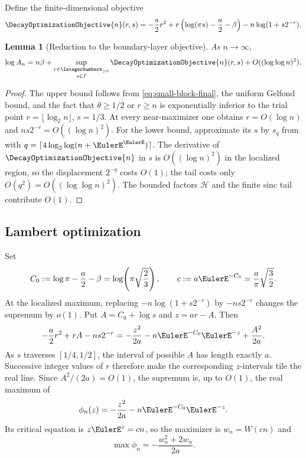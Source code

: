 \documentclass[11pt,oneside]{article}
\newtheorem{lemma}[lemma]{Lemma}
\theoremstyle{definition}
\theoremstyle{remark}
\begin{document}
Define the finite-dimensional objective
\begin{equation}
 \DecayOptimizationObjective{n}(r,s)
 =-\frac a2r^2+r\left(\log(\pi s)-\frac a2-\beta\right)
 -n\log(1+s2^{-r}).
 \label{eq:Fn-final}
\end{equation}

\begin{lemma}[Reduction to the boundary-layer objective]
\label{lem:An-reduction-final}
As $n\to\infty$,
\begin{equation}
 \log A_n=n\beta+
 \sup_{\substack{r\in\IntegerNumbers_{\ge0}\\s\in I}}\DecayOptimizationObjective{n}(r,s)
 +O((\log\log n)^2).
 \label{eq:An-reduction-final}
\end{equation}
\end{lemma}

\begin{proof}
The upper bound follows from \eqref{eq:small-block-final}, the uniform Gelfond bound, and the
fact that $\theta\ge1/2$ or $r\ge n$ is exponentially inferior to the trial point
$r=\lfloor\log_2n\rfloor$, $s=1/3$.  At every near-maximizer one obtains
$r=O(\log n)$ and $ns2^{-r}=O((\log n)^2)$.  For the lower bound, approximate its $s$ by
$s_q$ from  with
$q=\lceil4\log_2\log(n+\EulerE^\EulerE)\rceil$.  The derivative of $\DecayOptimizationObjective{n}$ in $s$ is
$O((\log n)^2)$ in the localized region, so the displacement $2^{-q}$ costs $O(1)$; the
tail costs only $O(q^2)=O((\log\log n)^2)$.  The bounded factors
$\mathcal H$ and the finite sinc tail contribute $O(1)$.
\end{proof}

\subsection{Lambert optimization}

Set
\begin{equation}
 C_0:=\log\pi-\frac a2-\beta=\log\!\left(\pi\sqrt{\frac23}\right),
 \qquad
 c:=a\EulerE^{-C_0}=\frac a\pi\sqrt{\frac32}.
 \label{eq:annular-c}
\end{equation}
At the localized maximum, replacing $-n\log(1+s2^{-r})$ by $-ns2^{-r}$ changes the
supremum by $o(1)$.  Put $A=C_0+\log s$ and $z=ar-A$.  Then
\begin{equation}
 -\frac a2r^2+rA-ns2^{-r}
 =-\frac{z^2}{2a}-n\EulerE^{-C_0}\EulerE^{-z}+\frac{A^2}{2a}.
 \label{eq:z-objective}
\end{equation}
As $s$ traverses $[1/4,1/2]$, the interval of possible $A$ has length exactly $a$.
Successive integer values of $r$ therefore make the corresponding $z$-intervals tile the
real line.  Since $A^2/(2a)=O(1)$, the supremum is, up to $O(1)$, the real maximum of
\[
 \phi_n(z)=-\frac{z^2}{2a}-n\EulerE^{-C_0}\EulerE^{-z}.
\]
Its critical equation is $z\EulerE^z=cn$, so the maximizer is $w_n=W(cn)$ and
\begin{equation}
 \max\phi_n=-\frac{w_n^2+2w_n}{2a}.
 \label{eq:Lambert-value}
\end{equation}
\end{document}
